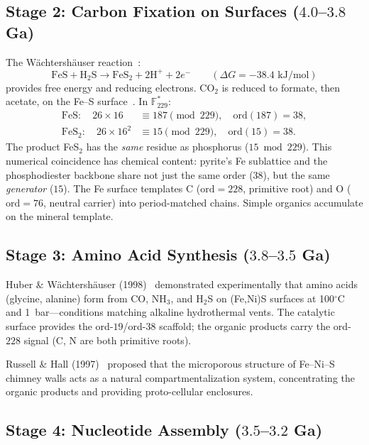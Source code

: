 \documentclass[12pt]{article}
\theoremstyle{principia}
\theoremstyle{definition}
\theoremstyle{remark}
\providecommand{\FF}{\mathbb{F}}
\begin{document}
\subsection{Stage 2: Carbon Fixation on Surfaces ($4.0$--$3.8$ Ga)}

The W\"achtersh\"auser reaction~\cite{Wachtershauser88}:
\begin{equation}\label{eq:wacht}
    \text{FeS} + \text{H}_2\text{S} \longrightarrow \text{FeS}_2 + 2\text{H}^+ + 2e^- \qquad (\Delta G = -38.4 \text{ kJ/mol})
\end{equation}
provides free energy and reducing electrons. CO$_2$ is reduced to formate, then acetate, on the Fe--S surface~\cite{Huber97}. In $\FF_{229}^*$:
\begin{align}
\mathrm{FeS}: \quad 26 \times 16 &\equiv 187 \pmod{229}, \quad \mathrm{ord}(187) = 38, \\
\mathrm{FeS}_2: \quad 26 \times 16^2 &\equiv 15 \pmod{229}, \quad \mathrm{ord}(15) = 38.
\end{align}
The product FeS$_2$ has the \emph{same} residue as phosphorus ($15 \bmod 229$). This numerical coincidence has chemical content: pyrite's Fe sublattice and the phosphodiester backbone share not just the same order ($38$), but the same \emph{generator} ($15$). The Fe surface templates C ($\mathrm{ord} = 228$, primitive root) and O ($\mathrm{ord} = 76$, neutral carrier) into period-matched chains. Simple organics accumulate on the mineral template.

\subsection{Stage 3: Amino Acid Synthesis ($3.8$--$3.5$ Ga)}

Huber \& W\"achtersh\"auser (1998)~\cite{Huber98} demonstrated experimentally that amino acids (glycine, alanine) form from CO, NH$_3$, and H$_2$S on (Fe,Ni)S surfaces at 100$^\circ$C and 1~bar---conditions matching alkaline hydrothermal vents. The catalytic surface provides the ord-$19$/ord-$38$ scaffold; the organic products carry the ord-$228$ signal (C, N are both primitive roots).

Russell \& Hall (1997)~\cite{Russell97} proposed that the microporous structure of Fe--Ni--S chimney walls acts as a natural compartmentalization system, concentrating the organic products and providing proto-cellular enclosures.

\subsection{Stage 4: Nucleotide Assembly ($3.5$--$3.2$ Ga)}
\end{document}

